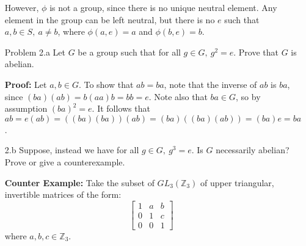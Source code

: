 \documentclass[letterpaper]{article}
\newcommand{\Integers}{\mathbb{Z}}
\begin{document}
\begin{itemize}
            However, \(\phi\) is not a group, since there is no unique neutral element. Any element in the group can be left neutral, but there is no \(e\) such that \(a, b \in S,\ a \neq b\), where \(\phi(a,e) = a\) and \(\phi(b, e) = b\).

      \item[Problem 2.a] Let \(G\) be a group such that for all \(g \in G,\ g^2 = e\). Prove that \(G\) is abelian.

            \textbf{Proof: }  Let \(a, b \in G\). To show that \(ab = ba\), note that the inverse of \(ab\) is \(ba\), since \((ba)(ab) = b(aa)b = bb = e\). Note also that \(ba \in G\), so by assumption \({(ba)}^2 = e\). It follows that \(ab = e(ab) = ((ba)(ba))(ab) = (ba)((ba)(ab)) = (ba)e = ba\).

      \item[2.b] Suppose, instead we have for all  \(g \in G,\ g^3 = e\). Is \(G\) necessarily abelian? Prove or give a counterexample.

            \textbf{Counter Example: } Take the subset of \(GL_3(\Integers_3)\) of upper triangular, invertible matrices of the form:
            \[
                  \begin{bmatrix}
                        1 & a & b \\
                        0 & 1 & c \\
                        0 & 0 & 1
                  \end{bmatrix}
            \]
            where \(a, b, c \in \Integers_3\).


\end{itemize}
\end{document}
